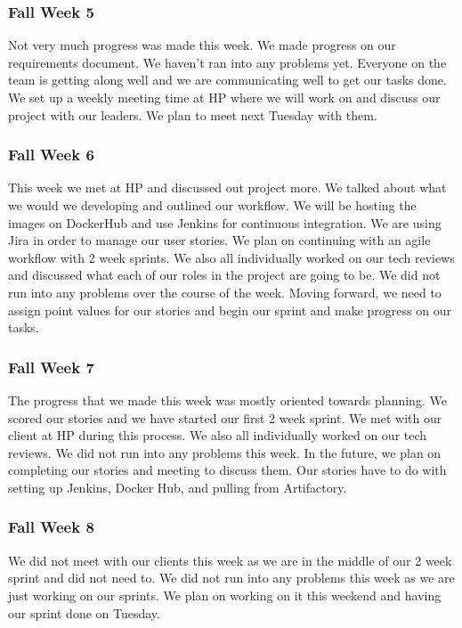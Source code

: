 \documentclass[onecolumn, draftclsnofoot,10pt, compsoc]{IEEEtran}
\begin{document}
\subsubsection*{Fall Week 5}
Not very much progress was made this week. We made progress on our requirements document. We haven't ran into any problems yet. Everyone on the team is getting along well and we are communicating well to get our tasks done. We set up a weekly meeting time at HP where we will work on and discuss our project with our leaders. We plan to meet next Tuesday with them.

\subsubsection*{Fall Week 6}
This week we met at HP and discussed out project more. We talked about what we would we developing and outlined our workflow. We will be hosting the images on DockerHub and use Jenkins for continuous integration. We are using Jira in order to manage our user stories. We plan on continuing with an agile workflow with 2 week sprints. We also all individually worked on our tech reviews and discussed what each of our roles in the project are going to be.  We did not run into any problems over the course of the week. Moving forward, we need to assign point values for our stories and begin our sprint and make progress on our tasks. 

\subsubsection*{Fall Week 7}
The progress that we made this week was mostly oriented towards planning. We scored our stories and we have started our first 2 week sprint. We met with our client at HP during this process. We also all individually worked on our tech reviews. We did not run into any problems this week. In the future, we plan on completing our stories and meeting to discuss them. Our stories have to do with setting up Jenkins, Docker Hub, and pulling from Artifactory. 

\subsubsection*{Fall Week 8}
We did not meet with our clients this week as we are in the middle of our 2 week sprint and did not need to. We did not run into any problems this week as we are just working on our sprints. We plan on working on it this weekend and having our sprint done on Tuesday.
\end{document}
